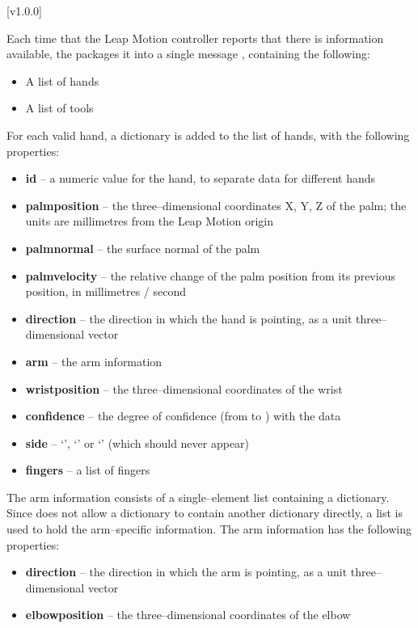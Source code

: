 [v1.0.0]

Each time that the Leap Motion controller reports that there is information available,
the  packages it into a single message
\openSq{}\closeSq, containing the following:
\begin{itemize}
\item A list of hands
\item A list of tools
\end{itemize}

For each valid hand, a dictionary \openSq{}\closeSq{} is added to the list
of hands, with the following properties:
\begin{itemize}
\item \textbf{id} -- a numeric value for the hand, to separate data for different hands
\item \textbf{palmposition} -- the three--dimensional coordinates \openSq{}X, Y,
Z\closeSq{} of the palm; the units are millimetres from the Leap Motion origin
\item \textbf{palmnormal} -- the surface normal of the palm
\item \textbf{palmvelocity} -- the relative change of the palm position from its previous
position, in millimetres / second
\item \textbf{direction} -- the direction in which the hand is pointing, as a unit
three--dimensional vector
\item \textbf{arm} -- the arm information
\item \textbf{wristposition} -- the three--dimensional coordinates of the wrist
\item \textbf{confidence} -- the degree of confidence (from  to ) with
the data
\item \textbf{side} -- `', `' or `' (which
should never appear)
\item \textbf{fingers} -- a list of fingers
\end{itemize}

The arm information consists of a single--element list containing a dictionary.
Since \yarp{} does not allow a dictionary to contain another dictionary directly, a list
is used to hold the arm--specific information.
The arm information has the following properties:
\begin{itemize}
\item \textbf{direction} -- the direction in which the arm is pointing, as a unit
three--dimensional vector
\item \textbf{elbowposition} -- the three--dimensional coordinates of the elbow
\end{itemize}

